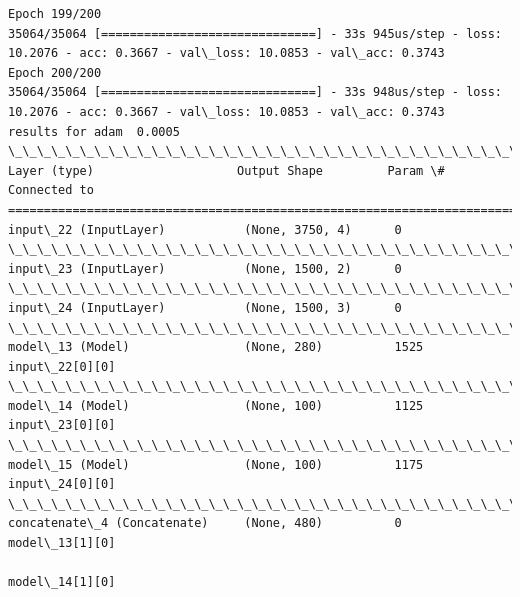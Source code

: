 \documentclass[11pt]{article}
\begin{document}
\begin{Verbatim}[commandchars=\\\{\}]
Epoch 199/200
35064/35064 [==============================] - 33s 945us/step - loss: 10.2076 - acc: 0.3667 - val\_loss: 10.0853 - val\_acc: 0.3743
Epoch 200/200
35064/35064 [==============================] - 33s 948us/step - loss: 10.2076 - acc: 0.3667 - val\_loss: 10.0853 - val\_acc: 0.3743
results for adam  0.0005
\_\_\_\_\_\_\_\_\_\_\_\_\_\_\_\_\_\_\_\_\_\_\_\_\_\_\_\_\_\_\_\_\_\_\_\_\_\_\_\_\_\_\_\_\_\_\_\_\_\_\_\_\_\_\_\_\_\_\_\_\_\_\_\_\_\_\_\_\_\_\_\_\_\_\_\_\_\_\_\_\_\_\_\_\_\_\_\_\_\_\_\_\_\_\_\_\_\_
Layer (type)                    Output Shape         Param \#     Connected to                     
==================================================================================================
input\_22 (InputLayer)           (None, 3750, 4)      0                                            
\_\_\_\_\_\_\_\_\_\_\_\_\_\_\_\_\_\_\_\_\_\_\_\_\_\_\_\_\_\_\_\_\_\_\_\_\_\_\_\_\_\_\_\_\_\_\_\_\_\_\_\_\_\_\_\_\_\_\_\_\_\_\_\_\_\_\_\_\_\_\_\_\_\_\_\_\_\_\_\_\_\_\_\_\_\_\_\_\_\_\_\_\_\_\_\_\_\_
input\_23 (InputLayer)           (None, 1500, 2)      0                                            
\_\_\_\_\_\_\_\_\_\_\_\_\_\_\_\_\_\_\_\_\_\_\_\_\_\_\_\_\_\_\_\_\_\_\_\_\_\_\_\_\_\_\_\_\_\_\_\_\_\_\_\_\_\_\_\_\_\_\_\_\_\_\_\_\_\_\_\_\_\_\_\_\_\_\_\_\_\_\_\_\_\_\_\_\_\_\_\_\_\_\_\_\_\_\_\_\_\_
input\_24 (InputLayer)           (None, 1500, 3)      0                                            
\_\_\_\_\_\_\_\_\_\_\_\_\_\_\_\_\_\_\_\_\_\_\_\_\_\_\_\_\_\_\_\_\_\_\_\_\_\_\_\_\_\_\_\_\_\_\_\_\_\_\_\_\_\_\_\_\_\_\_\_\_\_\_\_\_\_\_\_\_\_\_\_\_\_\_\_\_\_\_\_\_\_\_\_\_\_\_\_\_\_\_\_\_\_\_\_\_\_
model\_13 (Model)                (None, 280)          1525        input\_22[0][0]                   
\_\_\_\_\_\_\_\_\_\_\_\_\_\_\_\_\_\_\_\_\_\_\_\_\_\_\_\_\_\_\_\_\_\_\_\_\_\_\_\_\_\_\_\_\_\_\_\_\_\_\_\_\_\_\_\_\_\_\_\_\_\_\_\_\_\_\_\_\_\_\_\_\_\_\_\_\_\_\_\_\_\_\_\_\_\_\_\_\_\_\_\_\_\_\_\_\_\_
model\_14 (Model)                (None, 100)          1125        input\_23[0][0]                   
\_\_\_\_\_\_\_\_\_\_\_\_\_\_\_\_\_\_\_\_\_\_\_\_\_\_\_\_\_\_\_\_\_\_\_\_\_\_\_\_\_\_\_\_\_\_\_\_\_\_\_\_\_\_\_\_\_\_\_\_\_\_\_\_\_\_\_\_\_\_\_\_\_\_\_\_\_\_\_\_\_\_\_\_\_\_\_\_\_\_\_\_\_\_\_\_\_\_
model\_15 (Model)                (None, 100)          1175        input\_24[0][0]                   
\_\_\_\_\_\_\_\_\_\_\_\_\_\_\_\_\_\_\_\_\_\_\_\_\_\_\_\_\_\_\_\_\_\_\_\_\_\_\_\_\_\_\_\_\_\_\_\_\_\_\_\_\_\_\_\_\_\_\_\_\_\_\_\_\_\_\_\_\_\_\_\_\_\_\_\_\_\_\_\_\_\_\_\_\_\_\_\_\_\_\_\_\_\_\_\_\_\_
concatenate\_4 (Concatenate)     (None, 480)          0           model\_13[1][0]                   
                                                                 model\_14[1][0]                   

\end{Verbatim}
\end{document}
